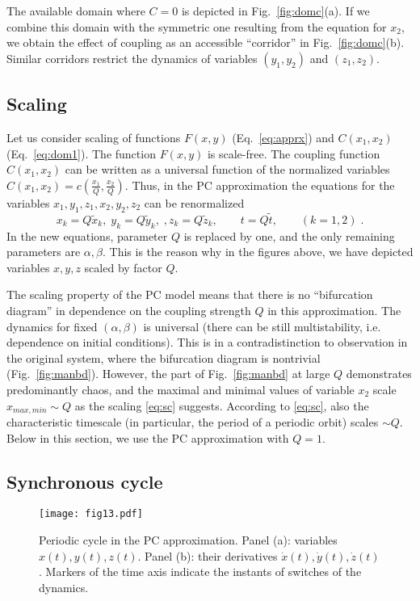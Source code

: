 \documentclass[3p,number,review,sort&compress]{elsarticle}
\begin{document}
The available domain where $C=0$ is depicted in Fig.~\ref{fig:domc}(a).
If we combine this domain with the symmetric one resulting from the equation for
$x_2$, we obtain the effect of coupling as an accessible ``corridor'' in Fig.~\ref{fig:domc}(b).
Similar corridors restrict the dynamics of variables $(y_1,y_2)$ and $(z_1,z_2)$.

\subsection{Scaling}
Let us consider scaling of functions $F(x,y)$ (Eq.~\eqref{eq:apprx})
and $C(x_1,x_2)$ (Eq.~\eqref{eq:dom1}). The function $F(x,y)$ is scale-free.
The coupling function  $C(x_1,x_2)$ can be written as a universal
function of the normalized variables $C(x_1,x_2)=c\left(\frac{x_1}{Q},\frac{x_2}{Q}\right)$. Thus, in the PC
approximation the equations for the variables $x_1,y_1,z_1,x_2,y_2,z_2$
can be renormalized 
\begin{equation}
x_k=Q \tilde{x}_k,\; y_k=Q\tilde{y}_k,\;,z_k=Q \tilde{z}_k,\qquad t=Q \tilde{t},\qquad (k=1,2)\;.
\label{eq:sc}
\end{equation}
In the new equations, parameter $Q$ is replaced by one, and the only remaining
parameters are $\alpha,\beta$. This is the reason why in the figures above,
we have depicted variables $x,y,z$ scaled by factor $Q$.



The scaling property of the PC model means that 
there is no ``bifurcation diagram'' in dependence 
on the coupling strength $Q$ in this approximation. The dynamics for fixed $(\alpha,\beta)$ is universal (there can be still multistability, i.e. dependence on initial conditions). This is in a contradistinction to observation in the original system, where the bifurcation diagram is nontrivial (Fig.~\ref{fig:manbd}). However,
the part of Fig.~\ref{fig:manbd} at large $Q$ demonstrates predominantly chaos, and
the maximal and minimal values of variable $x_2$ scale $x_{max,min}\sim Q$
as the scaling \eqref{eq:sc} suggests. According to \eqref{eq:sc},
also the characteristic timescale (in particular, the period of a periodic orbit) scales $\sim Q$.  Below in this section, we use the PC approximation with $Q=1$.

\subsection{Synchronous cycle}

\begin{figure}[!htb]
\centering
\texttt{[image: fig13.pdf]}
\caption{Periodic cycle in the PC approximation. Panel (a): variables $x(t),y(t),z(t)$. Panel (b): their derivatives $\dot x(t),\dot y(t),\dot z(t)$.
Markers of the time axis indicate the instants of
switches of the dynamics.}
\label{fig:m1_tr}
\end{figure}
\end{document}
